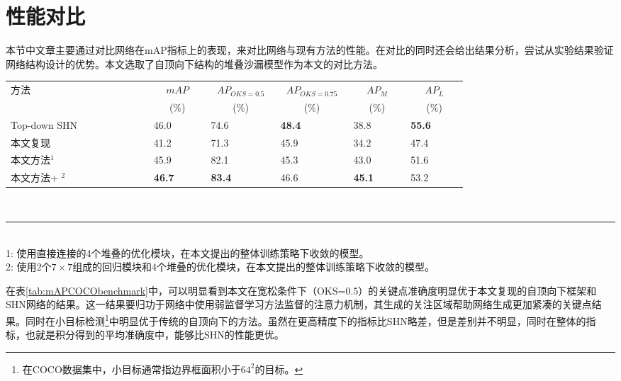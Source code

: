 \section{性能对比}
\label{sec:perfcompare}
本节中文章主要通过对比网络在mAP指标上的表现，来对比网络与现有方法的性能。在对比的同时还会给出结果分析，尝试从实验结果验证网络结构设计的优势。本文选取了自顶向下结构的堆叠沙漏模型作为本文的对比方法。
\begin{table*}[ht]
	\centering
	\caption{COCO公开测试集的模型性能对比}
	\label{tab:mAPCOCObenchmark}
	\begin{minipage}[t]{0.8\linewidth}
		\begin{tabular}{p{0.25\linewidth}p{0.1\linewidth}<{\centering}p{0.1\linewidth}<{\centering}p{0.1\linewidth}<{\centering}p{0.1\linewidth}<{\centering}p{0.1\linewidth}<{\centering}}
			\hline
			方法 & \multicolumn{1}{c}{$mAP$} & \multicolumn{1}{c}{$AP_{OKS=0.5}$} & \multicolumn{1}{c}{$AP_{OKS=0.75}$}
			& \multicolumn{1}{c}{$AP_M$} & \multicolumn{1}{c}{$AP_L$} \\
			
			& \multicolumn{1}{c}{(\%)}& \multicolumn{1}{c}{(\%)}&
			\multicolumn{1}{c}{(\%)}& \multicolumn{1}{c}{(\%)}& \multicolumn{1}{c}{
				(\%)}\\
			\hline
			Top-down SHN\cite{newell2016stacked} & 46.0 & 74.6 & \textbf{48.4} & 38.8  & \textbf{55.6} \\
			本文复现 & 41.2 & 71.3 & 45.9 & 34.2 & 47.4 \\
			本文方法$^1$ & 45.9 & 82.1 & 45.3 & 43.0 & 51.6 \\
			本文方法+ $^2$ & \textbf{46.7} & \textbf{83.4} & 46.6 & \textbf{45.1} & 53.2 \\
			\hline
		\end{tabular}\\[2pt]
		\noindent\rule{0.25\linewidth}{1pt} \\
		\footnotesize
		1: 使用直接连接的4个堆叠的优化模块，在本文提出的整体训练策略下收敛的模型。\\
		2: 使用2个$7\times7$组成的回归模块和4个堆叠的优化模块，在本文提出的整体训练策略下收敛的模型。
	\end{minipage}
\end{table*}

在表\ref{tab:mAPCOCObenchmark}中，可以明显看到本文在宽松条件下（OKS=0.5）的关键点准确度明显优于本文复现的自顶向下框架和SHN网络的结果。这一结果要归功于网络中使用弱监督学习方法监督的注意力机制，其生成的关注区域帮助网络生成更加紧凑的关键点结果。同时在小目标检测\footnote{在COCO数据集中，小目标通常指边界框面积小于$64^2$的目标。}中明显优于传统的自顶向下的方法。虽然在更高精度下的指标比SHN略差，但是差别并不明显，同时在整体的指标，也就是积分得到的平均准确度中，能够比SHN的性能更优。

